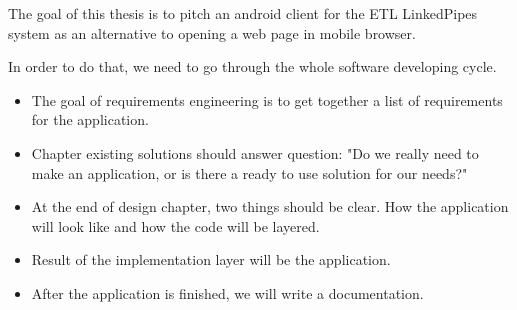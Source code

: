 The goal of this thesis is to pitch an android client for the ETL LinkedPipes system as an alternative to opening a web page in mobile browser.

In order to do that, we need to go through the whole software developing cycle.
\begin{itemize}
    \item The goal of requirements engineering is to get together a list of requirements for the application.
    \item Chapter existing solutions should answer question: "Do we really need to make an application, or is there a ready to use solution for our needs?"
    \item At the end of design chapter, two things should be clear. How the application will look like and how the code will be layered.
    \item Result of the implementation layer will be the application.
    \item After the application is finished, we will write a documentation.
\end{itemize}